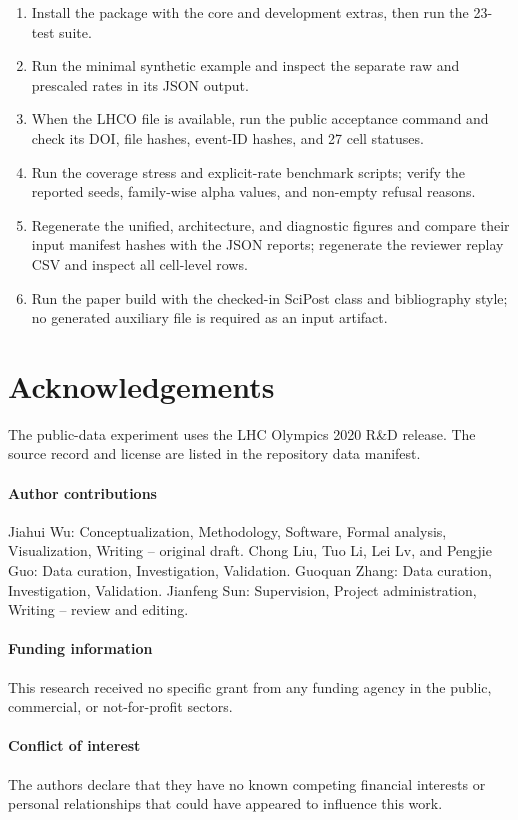 \documentclass[submission, Phys]{SciPost}
\begin{document}
\begin{enumerate}
\item Install the package with the core and development extras, then run the
      23-test suite.
\item Run the minimal synthetic example and inspect the separate raw and
      prescaled rates in its JSON output.
\item When the LHCO file is available, run the public acceptance command and
      check its DOI, file hashes, event-ID hashes, and 27 cell statuses.
\item Run the coverage stress and explicit-rate benchmark scripts; verify the
      reported seeds, family-wise alpha values, and non-empty refusal reasons.
\item Regenerate the unified, architecture, and diagnostic figures and compare
      their input manifest hashes with the JSON reports; regenerate the
      reviewer replay CSV and inspect all cell-level rows.
\item Run the paper build with the checked-in SciPost class and bibliography
      style; no generated auxiliary file is required as an input artifact.
\end{enumerate}

\section*{Acknowledgements}
The public-data experiment uses the LHC Olympics 2020 R\&D release.  The source
record and license are listed in the repository data manifest.

\paragraph{Author contributions}
Jiahui Wu: Conceptualization, Methodology, Software, Formal analysis,
Visualization, Writing -- original draft. Chong Liu, Tuo Li, Lei Lv, and
Pengjie Guo: Data curation, Investigation, Validation. Guoquan Zhang: Data
curation, Investigation, Validation. Jianfeng Sun: Supervision, Project
administration, Writing -- review and editing.

\paragraph{Funding information}
This research received no specific grant from any funding agency in the
public, commercial, or not-for-profit sectors.

\paragraph{Conflict of interest}
The authors declare that they have no known competing financial interests or
personal relationships that could have appeared to influence this work.


\end{document}
